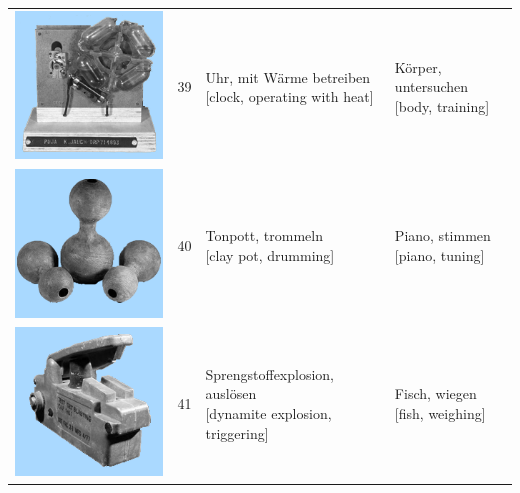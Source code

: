 \documentclass[
  english,
  man,floatsintext]{apa7}
\begin{document}
\begin{center}
\begin{ThreePartTable}
{\begin{longtable}{llll}
\includegraphics[valign=c, scale=0.23]{../materials/unfamiliar/39.png} & 39 & \makecell[l]{Uhr, mit Wärme betreiben\\{[clock, operating with heat]}} & \makecell[l]{Körper, untersuchen\\{[body, training]}}\\
\includegraphics[valign=c, scale=0.23]{../materials/unfamiliar/40.png} & 40 & \makecell[l]{Tonpott, trommeln\\{[clay pot, drumming]}} & \makecell[l]{Piano, stimmen\\{[piano, tuning]}}\\
\includegraphics[valign=c, scale=0.23]{../materials/unfamiliar/41.png} & 41 & \makecell[l]{Sprengstoffexplosion, auslösen\\{[dynamite explosion, triggering]}} & \makecell[l]{Fisch, wiegen\\{[fish, weighing]}}\\

\end{longtable}}
\end{ThreePartTable}
\end{center}
\end{document}
